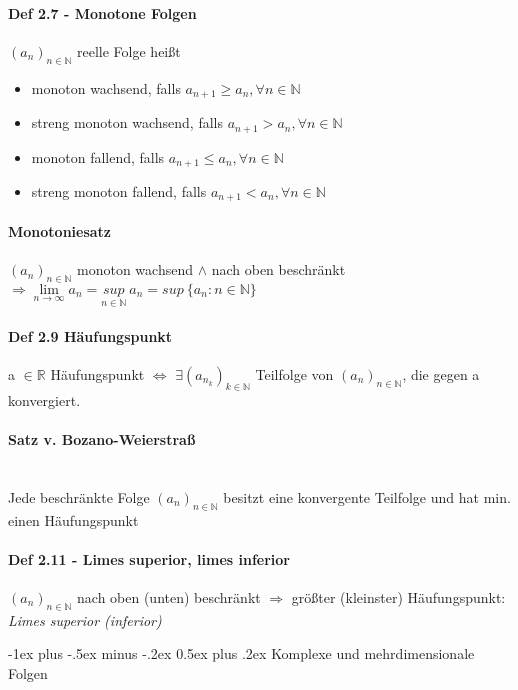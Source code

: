 \documentclass[paper=a3,paper=landscape, fontsize=9pt,DIV=30]{scrartcl}
\makeatletter
\newcommand{\real}{{\mathbb{R}}}
\newcommand{\nat}{\mathbb{N}}
\newcommand{\aseq}{(a_n)_{n \in \nat}}
\renewcommand{\section}{\@startsection{section}{1}{0mm}%
  {-1ex plus -.5ex minus -.2ex}%
  {0.5ex plus .2ex}%
  {\color{blue}\normalfont\large\bfseries}}
\makeatother
\begin{document}
\begin{multicols*}{4}
  \paragraph{Def 2.7 - Monotone Folgen}
  $\aseq$ reelle Folge heißt
  \begin{itemize}
  \item monoton wachsend, falls $a_{n+1} \geq a_n, \forall n \in \nat$
  \item streng monoton wachsend, falls  $a_{n+1} > a_n, \forall n \in \nat$
  \item monoton fallend, falls  $a_{n+1} \leq a_n, \forall n \in \nat$
  \item streng monoton fallend, falls  $a_{n+1} < a_n, \forall n \in \nat$
  \end{itemize}

 \paragraph{Monotoniesatz}
 $\aseq$ monoton wachsend $\wedge$ nach oben beschränkt $\Rightarrow \lim\limits_{n \rightarrow \infty} a_n = \underset{n \in \nat}{sup}\:a_n = sup\:\{a_n:n \in \nat\}$


  \paragraph{Def 2.9 Häufungspunkt}
  a $\in \real$ Häufungspunkt $\Leftrightarrow$ $ \exists (a_{n_k})_{k \in \nat}$ Teilfolge von $\aseq$, die gegen a konvergiert.


 \paragraph{Satz v. Bozano-Weierstraß}\hspace{0pt} \\
 Jede beschränkte Folge $\aseq$ besitzt eine konvergente Teilfolge und hat min. einen Häufungspunkt


  \paragraph{Def 2.11 - Limes superior, limes inferior}
  $\aseq$ nach oben (unten) beschränkt $\Rightarrow$ größter (kleinster) Häufungspunkt: \emph{Limes superior (inferior)}



\section{Komplexe und mehrdimensionale Folgen}


\end{multicols*}
\end{document}
